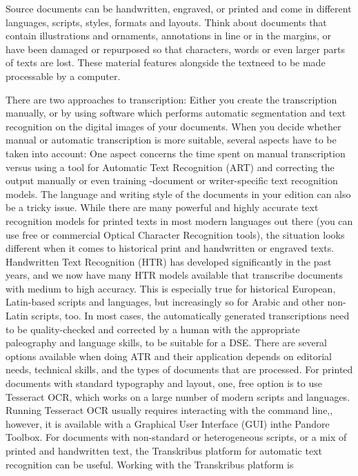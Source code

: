\documentclass[
  letterpaper,
  DIV=11,
  numbers=noendperiod]{scrreprt}
\begin{document}
Source documents can be handwritten, engraved, or printed and come in
different languages, scripts, styles, formats and layouts. Think about
documents that contain illustrations and ornaments, annotations in line
or in the margins, or have been damaged or repurposed so that
characters, words or even larger parts of texts are lost. These material
features alongside the textneed to be made processable by a computer.

There are two approaches to transcription: Either you create the
transcription manually, or by using software which performs automatic
segmentation and text recognition on the digital images of your
documents. When you decide whether manual or automatic transcription is
more suitable, several aspects have to be taken into account: One aspect
concerns the time spent on manual transcription versus using a tool for
Automatic Text Recognition (ART) and correcting the output manually or
even training -document or writer-specific text recognition models. The
language and writing style of the documents in your edition can also be
a tricky issue. While there are many powerful and highly accurate text
recognition models for printed texts in most modern languages out there
(you can use free or commercial Optical Character Recognition tools),
the situation looks different when it comes to historical print and
handwritten or engraved texts. Handwritten Text Recognition (HTR) has
developed significantly in the past years, and we now have many HTR
models available that transcribe documents with medium to high accuracy.
This is especially true for historical European, Latin-based scripts and
languages, but increasingly so for Arabic and other non-Latin scripts,
too. In most cases, the automatically generated transcriptions need to
be quality-checked and corrected by a human with the appropriate
paleography and language skills, to be suitable for a DSE. There are
several options available when doing ATR and their application depends
on editorial needs, technical skills, and the types of documents that
are processed. For printed documents with standard typography and
layout, one, free option is to use Tesseract OCR, which works on a large
number of modern scripts and languages. Running Tesseract OCR usually
requires interacting with the command line,, however, it is available
with a Graphical User Interface (GUI) inthe Pandore Toolbox. For
documents with non-standard or heterogeneous scripts, or a mix of
printed and handwritten text, the Transkribus platform for automatic
text recognition can be useful. Working with the Transkribus platform is
\end{document}
